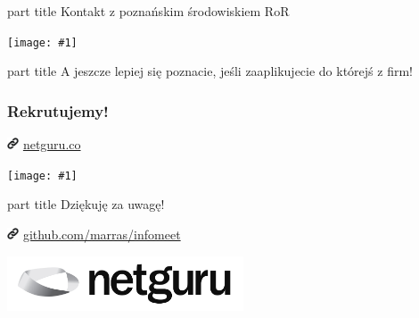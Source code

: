 \documentclass{beamer}
\newcommand{\myfullimage}[1]{%
    \hspace*{-1.1cm}
    \texttt{[image: \#1]}
}
\newcommand{\myurl}[1]{%
    \begin{block}{}
       \centering \huge
       \includegraphics[width=0.35cm]{link.png}
       \hspace{0.1cm}
       \url{#1}
    \end{block}
}
\newcommand{\mybox}[1]{%
    \begin{centering}
    \vspace{1em}\par
        \begin{beamercolorbox}[rounded=true,sep=4pt,center]{part title}
           \huge #1
        \end{beamercolorbox}
    \end{centering}
}
\newcommand{\mytitle}[1]{%
    \begin{frame}[plain]
        \mybox{#1}
    \end{frame}
}
\begin{document}
\begin{frame}[plain]
\mybox{Kontakt z poznańskim środowiskiem RoR}
\vspace{0.5cm}
\myfullimage{netgurale.jpg}
\end{frame}

\mytitle{A jeszcze lepiej się poznacie, jeśli zaaplikujecie do którejś z firm!}

\begin{frame}[fragile]
\frametitle{Rekrutujemy!}
\myurl{netguru.co}
\myfullimage{rekrutacja.png}
\end{frame}

\begin{frame}[plain]
\begin{centering}
    \vspace{1em}\par
        \begin{beamercolorbox}[rounded=true,sep=4pt,center]{part title}
           \huge Dziękuję za uwagę!
        \end{beamercolorbox}
    \vspace{0.5cm}
    \myurl{github.com/marras/infomeet}
    \vspace{1.5cm}
    \includegraphics[width=7cm]{netguru_logo.jpg} \par
\end{centering}
\end{frame}
\end{document}
